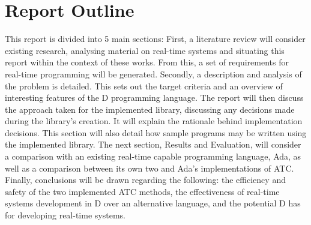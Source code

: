 \section{Report Outline} %
This report is divided into 5 main sections:
First, a literature review will 
consider existing research, analysing material on 
real-time systems and situating this report within the context of these works. 
From this, a set of requirements for real-time programming will be generated. 
Secondly, a description and analysis of the problem is detailed. This sets out 
the target criteria and an overview of interesting features of the D programming 
language. 
The report will then discuss the approach taken for the implemented library, 
discussing any decisions made during the library's creation. It will explain the 
rationale behind implementation decisions. This section will also detail 
how sample programs may be written using the implemented library. 
The next section, Results and Evaluation, will consider a comparison with an 
existing real-time capable programming language, Ada, as well as a comparison 
between its own two and Ada's implementations of ATC. 
Finally, conclusions will be drawn regarding the following: 
the efficiency and safety of the two implemented ATC methods, 
the effectiveness of real-time systems development in D over an alternative language, 
and the potential D has for developing real-time systems.
